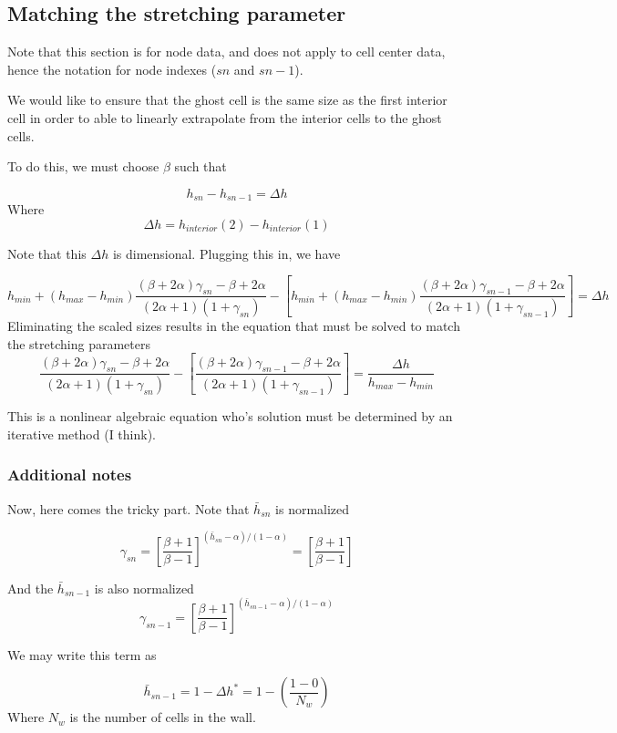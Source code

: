 \documentclass[11pt]{article}
\begin{document}
\subsection{Matching the stretching parameter}
Note that this section is for node data, and does not apply to cell center data, hence the notation for node indexes ($sn$ and $sn-1$).

We would like to ensure that the ghost cell is the same size as the first interior cell in order to able to linearly extrapolate from the interior cells to the ghost cells.

To do this, we must choose $\beta$ such that

\begin{equation}
	h_{sn} - h_{sn-1} = \Delta h
\end{equation}
Where
\begin{equation}
	\Delta h = h_{interior}(2) - h_{interior}(1)
\end{equation}

Note that this $\Delta h$ is dimensional. Plugging this in, we have

\begin{equation}
	h_{min} + (h_{max}-h_{min}) \frac{(\beta+2\alpha)\gamma_{sn} - \beta + 2\alpha}{(2\alpha+1)(1+\gamma_{sn})}
	-
	\left[
	h_{min} + (h_{max}-h_{min}) \frac{(\beta+2\alpha)\gamma_{sn-1} - \beta + 2\alpha}{(2\alpha+1)(1+\gamma_{sn-1})}
	\right]
	=
	\Delta h
\end{equation}
Eliminating the scaled sizes results in the equation that must be solved to match the stretching parameters
\begin{equation}
	\boxed{
	\frac{(\beta+2\alpha)\gamma_{sn} - \beta + 2\alpha}{(2\alpha+1)(1+\gamma_{sn})}
	-
	\left[
	\frac{(\beta+2\alpha)\gamma_{sn-1} - \beta + 2\alpha}{(2\alpha+1)(1+\gamma_{sn-1})}
	\right]
	=
	\frac{\Delta h}{h_{max}-h_{min}}
	}
\end{equation}

This is a nonlinear algebraic equation who's solution must be determined by an iterative method (I think).

\subsubsection{Additional notes}
Now, here comes the tricky part.
Note that $\bar{h}_{sn}$ is normalized

\begin{equation}
	\gamma_{sn} = \left[
	\frac{\beta+1}{\beta-1}
	\right]^{(\bar{h}_{sn}-\alpha)/(1-\alpha)} =
	\left[
	\frac{\beta+1}{\beta-1}
	\right]
\end{equation}


And the $\bar{h}_{sn-1}$ is also normalized
\begin{equation}
	\gamma_{sn-1} = \left[
	\frac{\beta+1}{\beta-1}
	\right]^{(\bar{h}_{sn-1}-\alpha)/(1-\alpha)}
\end{equation}

We may write this term as

\begin{equation}
	\bar{h}_{sn-1} = 1 - \Delta h^* = 1 - \left( \frac{1-0}{N_w} \right)
\end{equation}
Where $N_w$ is the number of cells in the wall.
\end{document}
